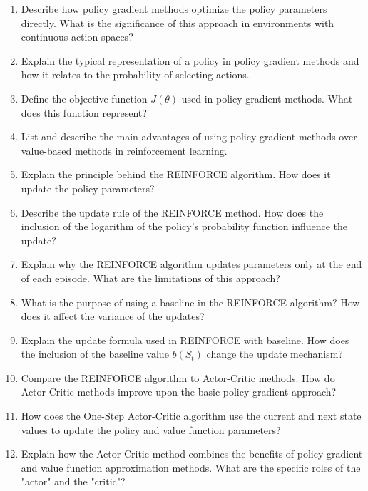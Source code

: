 \begin{enumerate}

	\item Describe how policy gradient methods optimize the policy parameters directly. What is the significance of this approach in environments with continuous action spaces?
    \item Explain the typical representation of a policy in policy gradient methods and how it relates to the probability of selecting actions.
    \item Define the objective function $J(\theta)$ used in policy gradient methods. What does this function represent?
    \item List and describe the main advantages of using policy gradient methods over value-based methods in reinforcement learning.
    \item Explain the principle behind the REINFORCE algorithm. How does it update the policy parameters?
    \item Describe the update rule of the REINFORCE method. How does the inclusion of the logarithm of the policy's probability function influence the update?
    \item Explain why the REINFORCE algorithm updates parameters only at the end of each episode. What are the limitations of this approach?
    \item What is the purpose of using a baseline in the REINFORCE algorithm? How does it affect the variance of the updates?
    \item Explain the update formula used in REINFORCE with baseline. How does the inclusion of the baseline value $b(S_t)$ change the update mechanism?
    \item Compare the REINFORCE algorithm to Actor-Critic methods. How do Actor-Critic methods improve upon the basic policy gradient approach?
    \item How does the One-Step Actor-Critic algorithm use the current and next state values to update the policy and value function parameters?
    \item Explain how the Actor-Critic method combines the benefits of policy gradient and value function approximation methods. What are the specific roles of the "actor" and the "critic"?
\end{enumerate}
